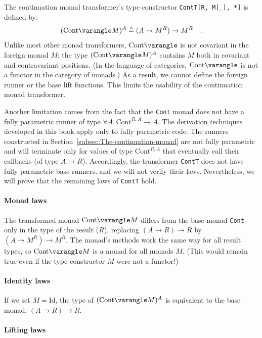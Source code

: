 The continuation monad transformer\textsf{'}s type constructor \lstinline!ContT[R, M[_], *]!
is defined by:
\[
(\text{Cont}\varangle M)^{A}\triangleq(A\rightarrow M^{R})\rightarrow M^{R}\quad.
\]
Unlike most other monad transformers, $\text{Cont}\varangle$ is not
covariant in the foreign monad $M$: the type $(\text{Cont}\varangle M)^{A}$
contains $M$ both in covariant and contravariant positions. (In the
language of categories, $\text{Cont}\varangle$ is not a functor in
the category of monads.) As a result, we cannot define the foreign
runner or the base lift functions. This limits the usability of the
continuation monad transformer. 

Another limitation comes from the fact that the \lstinline!Cont!
monad does not have a fully parametric runner of type $\forall A.\,\text{Cont}^{R,A}\rightarrow A$.
The derivation techniques developed in this book apply only to fully
parametric code. The runners constructed in Section~\ref{subsec:The-continuation-monad}
are not fully parametric and will terminate only for values of type
$\text{Cont}^{R,A}$ that eventually call their callbacks (of type
$A\rightarrow R$). Accordingly, the transformer \lstinline!ContT!
does not have fully parametric base runners, and we will not verify
their laws. Nevertheless, we will prove that the remaining laws of
\lstinline!ContT! hold.

\paragraph{Monad laws}

The transformed monad $\text{Cont}\varangle M$ differs from the base
monad \lstinline!Cont! only in the type of the result ($R$), replacing
$\left(A\rightarrow R\right)\rightarrow R$ by $(A\rightarrow M^{R})\rightarrow M^{R}$.
The monad\textsf{'}s methods work the same way for all result types, so $\text{Cont}\varangle M$
is a monad for all monads $M$. (This would remain true even if the
type constructor $M$ were not a functor!)

\paragraph{Identity laws}

If we set $M=\text{Id}$, the type of $(\text{Cont}\varangle M)^{A}$
is equivalent to the base monad, $\left(A\rightarrow R\right)\rightarrow R$.

\paragraph{Lifting laws}

